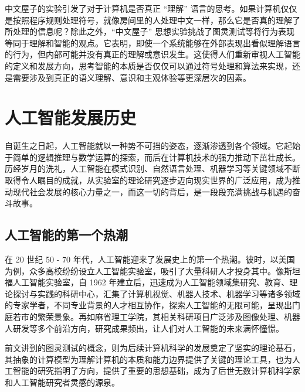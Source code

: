 中文屋子的实验引发了对于计算机是否真正 “理解” 语言的思考。如果计算机仅仅是按照程序规则处理符号，就像房间里的人处理中文一样，那么它是否真的理解了所处理的信息呢？除此之外，“中文屋子” 思想实验挑战了图灵测试等将行为表现等同于理解和智能的观点。它表明，即使一个系统能够在外部表现出看似理解语言的行为，但内部可能并没有真正的理解或意识发生。这使得人们重新审视人工智能的定义和发展方向，思考智能的本质是否仅仅可以通过符号处理和算法来实现，还是需要涉及到真正的语义理解、意识和主观体验等更深层次的因素。

\section{人工智能发展历史}




自诞生之日起，人工智能就以一种势不可挡的姿态，逐渐渗透到各个领域。它起始于简单的逻辑推理与数学运算的探索，而后在计算机技术的强力推动下茁壮成长。历经岁月的洗礼，人工智能在模式识别、自然语言处理、机器学习等关键领域不断取得令人瞩目的成就，从实验室的理论研究逐步迈向现实世界的广泛应用，成为推动现代社会发展的核心力量之一，而这一切的背后，是一段段充满挑战与机遇的奋斗故事。


\subsection{人工智能的第一个热潮}


在 20 世纪 50 - 70 年代，人工智能迎来了发展史上的第一个热潮。彼时，以美国为例，众多高校纷纷设立人工智能实验室，吸引了大量科研人才投身其中。像斯坦福人工智能实验室，自 1962 年建立后，迅速成为人工智能领域集研究、教育、理论探讨与实践的科研中心，汇集了计算机视觉、机器人技术、机器学习等诸多领域的专家学者，不同专业背景的人才相互协作，探索人工智能的无限可能，呈现出门庭若市的繁荣景象。再如麻省理工学院，其相关科研项目广泛涉及图像处理、机器人研发等多个前沿方向，研究成果频出，让人们对人工智能的未来满怀憧憬。


前文讲到的图灵测试的概念，则为后续计算机科学的发展奠定了坚实的理论基石，其抽象的计算模型为理解计算机的本质和能力边界提供了关键的理论工具，也为人工智能的研究指明了方向，提供了重要的思想基础，成为了后世无数计算机科学家和人工智能研究者灵感的源泉。


